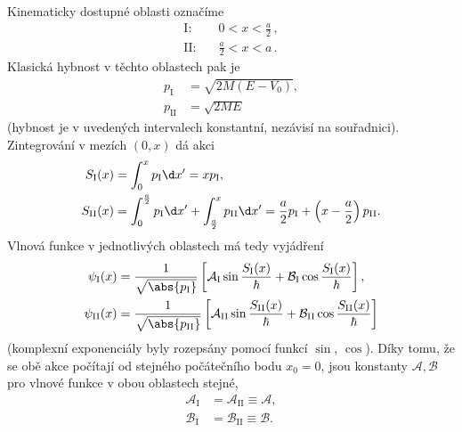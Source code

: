 \begin{solution}
	Kinematicky dostupné oblasti označíme
	\begin{align}
		\text{I:} & \quad 0<x<\frac{a}{2}\,, \nonumber\\
		\text{II:} & \quad \frac{a}{2}<x<a\,.\nonumber
	\end{align}
	Klasická hybnost v těchto oblastech pak je
    \begin{subequations}
        \begin{align}
            p_{\mathrm{I}}&=\sqrt{2M\left(E-V_{0}\right)},\\
            p_{\mathrm{II}}&=\sqrt{2ME}
        \end{align}            
    \end{subequations}
	(hybnost je v uvedených intervalech konstantní, nezávisí na souřadnici).
	Zintegrování v mezích $(0,x)$ dá akci
    \begin{subequations}
        \begin{align}
            S_{\mathrm{I}}(x)&=\int_{0}^{x}p_{\mathrm{I}}\d x'=xp_{\mathrm{I}},\\
            S_{\mathrm{II}}(x)
                &=\int_{0}^{\frac{a}{2}}p_{\mathrm{I}}\d x'+\int_{\frac{a}{2}}^{x}p_{\mathrm{II}}\d x'=\frac{a}{2}p_{\mathrm{I}}+\left(x-\frac{a}{2}\right)p_{\mathrm{II}}.
        \end{align}            
    \end{subequations}
	Vlnová funkce v jednotlivých oblastech má tedy vyjádření
    \begin{subequations}
        \begin{align}
            \psi_{\mathrm{I}}(x)&=\frac{1}{\sqrt{\abs{p_{\mathrm{I}}}}}\left[\mathcal{A}_{\mathrm{I}}\sin{\frac{S_{\mathrm{I}}(x)}{\hbar}}+\mathcal{B}_{\mathrm{I}}\cos{\frac{S_{\mathrm{I}}(x)}{\hbar}}\right],\\
            \psi_{\mathrm{II}}(x)&=\frac{1}{\sqrt{\abs{p_{\mathrm{II}}}}}\left[\mathcal{A}_{\mathrm{II}}\sin{\frac{S_{\mathrm{II}}(x)}{\hbar}}+\mathcal{B}_{\mathrm{II}}\cos{\frac{S_{\mathrm{II}}(x)}{\hbar}}\right]
        \end{align}            
    \end{subequations}
	(komplexní exponenciály byly rozepsány pomocí funkcí $\sin$, $\cos$).
	Díky tomu, že se obě akce počítají od stejného počátečního bodu $x_{0}=0$, jsou konstanty $\mathcal{A},\mathcal{B}$ pro vlnové funkce v obou oblastech stejné,
	\begin{subequations}
		\begin{align}
			\mathcal{A}_{\mathrm{I}}&=\mathcal{A}_{\mathrm{II}}\equiv\mathcal{A},\\
			\mathcal{B}_{\mathrm{I}}&=\mathcal{B}_{\mathrm{II}}\equiv\mathcal{B}.
		\end{align}
	\end{subequations}
	

\end{solution}
